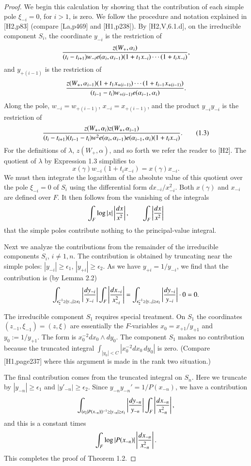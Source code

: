 \documentclass{amsart}
\begin{document}
\begin{proof}
We begin this calculation by showing that the contribution
of each simple pole $\xi_{-i}=0$, for $i>1$,  is zero.  We follow
the procedure and notation explained in [H2,p83] (compare
[La,p469] and [H1,p238]).  
By [H2,V,6.1.d], on the irreducible component $S_i$,
the coordinate
$y_{-i}$ is the restriction of
$${z(W_+,\alpha_i)\over (t_i-t_{i+1}) w_{-i} e(\alpha_i,\alpha_{i-1})(1+t_1 x_{-i})
\cdots (1+t_i x_{-i} )},$$
and $y_{+(i-1)}$ is the restriction of
$${z(W_+,\alpha_{i-1}) (1+t_1 x_{+(i-1)})\cdots (1+t_{i-1} x_{+(i-1)})\over
(t_{i-1}-t_i) w_{+(i-1)} e(\alpha_{i-1},\alpha_i)}.$$
Along the pole, $w_{-i}=w_{+(i-1)}$, $x_{-i} = x_{+(i-1)}$, 
and the product $y_{-i}y_{-i}$ is the restriction
of 
\begin{equation}{z(W_+,\alpha_i)z(W_+,\alpha_{i-1})\over
(t_i-t_{i+1})(t_{i-1}-t_i) w^2 e(\alpha_i,\alpha_{i-1})e(\alpha_{i-1},\alpha_i)
(1+t_i x_{-i})}.\tag{1.3}
\end{equation}
For the definitions of $\lambda$, $z(W_+,\alpha)$, and so forth
we refer the reader to [H2].
The quotient of $\lambda$ by Expression 1.3 simplifies to
$$ x(\gamma)w_{-i}(1+t_i x_{-i} ) = x(\gamma) x_{-i}.$$
We must then integrate the logarithm of the absolute value 
of this quotient 
over the pole $\xi_{-i}=0$ of $S_i$ using the differential
form $d x_{-i}/x_{-i}^2$. Both $x(\gamma)$ and
$x_{-i}$ are defined over $F$.  It then follows from the
vanishing of the integrals
$$\int_F \log|x| \left | {dx\over x^2}\right|,\qquad
  \int_F \left| {dx\over x^2}\right |$$
that the simple poles contribute nothing to the principal-value
integral.

Next we analyze the contributions from the remainder of the
irreducible components $S_i$, $i\ne 1,n$.  The contribution
is obtained by truncating near the simple poles:
$|y_{-i}|\ge \epsilon_1$, $|y_{+i}|\ge \epsilon_2$.
As we have $y_{+i}=1/y_{-i}$, we find that the contribution
is (by Lemma 2.2)
$$\int_{\epsilon^{-1}_2 \ge |y_{-i}|\ge \epsilon_1}
\left| {dy_{-i}\over y_{-i}}\right |
\int_F \left| { dx_{-i}\over x^2_{-i}}\right| =
\int_{\epsilon^{-1}_2 \ge |y_{-i}|\ge \epsilon_1}
\left| {dy_{-i}\over y_{-i}}\right | \cdot 0 = 0.$$

The irreducible component $S_1$ requires special treatment.
On $S_1$ the coordinates $(z_{-1},\xi_{-1}) = (z,\xi)$
are essentially the $F$-variables $x_0 = x_{+1}/y_{+1}$
and $y_0 := 1/y_{+1}$.  The form is $x_0^{-2} dx_0\wedge dy_0$.
The component $S_1$ makes no contribution because the truncated
integral $\int_{|y_0|< C} |x_0^{-2} dx_0\,dy_0|$ is zero.
(Compare [H1,page237] where this argument is made in the
rank two situation.)

The final contribution comes from the truncated integral on $S_n$.
Here we truncate by $|y_{-n}|\ge \epsilon_1$ and $|y'_{-n}|\ge \epsilon_2$.
Since $y_{-n}y_{-n}' = 1/P(x_{-n})$, we have a contribution
$$
\int_{(\epsilon_2 |P(x_{-n})|)^{-1} \ge |y_{-n}|\ge \epsilon_1}
\left| {dy_{-n}\over y_{-n}} \right |
\int_F \left|{dx_{-n}\over x_{-n}^2}\right |,$$
and this is a constant times
$$\int_F \log|P(x_{-n})| \left|{dx_{-n}\over x_{-n}^2}\right|.$$
This completes the proof of Theorem 1.2.
\end{proof}
\end{document}
